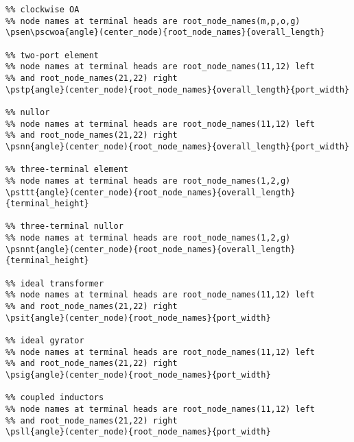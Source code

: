 \documentclass[12pt,a4paper]{article}
\begin{document}
\begin{verbatim}
%% clockwise OA
%% node names at terminal heads are root_node_names(m,p,o,g)
\psen\pscwoa{angle}(center_node){root_node_names}{overall_length}

%% two-port element
%% node names at terminal heads are root_node_names(11,12) left
%% and root_node_names(21,22) right
\pstp{angle}(center_node){root_node_names}{overall_length}{port_width}

%% nullor
%% node names at terminal heads are root_node_names(11,12) left
%% and root_node_names(21,22) right
\psnn{angle}(center_node){root_node_names}{overall_length}{port_width}

%% three-terminal element
%% node names at terminal heads are root_node_names(1,2,g)
\psttt{angle}(center_node){root_node_names}{overall_length}
{terminal_height}

%% three-terminal nullor
%% node names at terminal heads are root_node_names(1,2,g)
\psnnt{angle}(center_node){root_node_names}{overall_length}
{terminal_height}

%% ideal transformer
%% node names at terminal heads are root_node_names(11,12) left
%% and root_node_names(21,22) right
\psit{angle}(center_node){root_node_names}{port_width}

%% ideal gyrator
%% node names at terminal heads are root_node_names(11,12) left
%% and root_node_names(21,22) right
\psig{angle}(center_node){root_node_names}{port_width}

%% coupled inductors
%% node names at terminal heads are root_node_names(11,12) left
%% and root_node_names(21,22) right
\psll{angle}(center_node){root_node_names}{port_width}

\end{verbatim}
\end{document}

